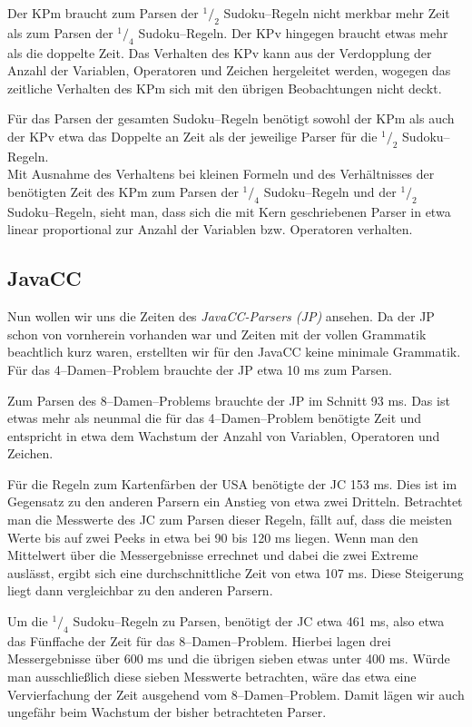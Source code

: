 \documentclass[ngerman,a4paper,abstracton,open=right,twoside=false,toc=listofnumbered,bibtotocnumbered]{scrreprt}
\begin{document}
Der KPm braucht zum Parsen der $^1/_2$ Sudoku--Regeln nicht merkbar mehr Zeit als zum Parsen der $^1/_4$ Sudoku--Regeln. Der KPv hingegen braucht etwas mehr als die doppelte Zeit. Das Verhalten des KPv kann aus der Verdopplung der Anzahl der Variablen, Operatoren und Zeichen hergeleitet werden, wogegen das zeitliche Verhalten des KPm sich mit den übrigen Beobachtungen nicht deckt.

Für das Parsen der gesamten Sudoku--Regeln benötigt sowohl der KPm als auch der KPv etwa das Doppelte an Zeit als der jeweilige Parser für die $^1/_2$ Sudoku--Regeln.\\

Mit Ausnahme des Verhaltens bei kleinen Formeln und des Verhältnisses der benötigten Zeit des KPm zum Parsen der $^1/_4$ Sudoku--Regeln und der $^1/_2$ Sudoku--Regeln, sieht man, dass sich die mit Kern geschriebenen Parser in etwa linear proportional zur Anzahl der Variablen bzw. Operatoren verhalten.

\subsection{JavaCC}

Nun wollen wir uns die Zeiten des \emph{JavaCC-Parsers (JP)} ansehen. Da der JP schon von vornherein vorhanden war und Zeiten mit der vollen Grammatik beachtlich kurz waren, erstellten wir für den JavaCC keine minimale Grammatik. Für das 4--Damen--Problem brauchte der JP etwa 10 ms zum Parsen.

Zum Parsen des 8--Damen--Problems brauchte der JP im Schnitt 93 ms. Das ist etwas mehr als neunmal die für das 4--Damen--Problem benötigte Zeit und entspricht in etwa dem Wachstum der Anzahl von Variablen, Operatoren und Zeichen.

Für die Regeln zum Kartenfärben der USA benötigte der JC 153 ms. Dies ist im Gegensatz zu den anderen Parsern ein Anstieg von etwa zwei Dritteln. Betrachtet man die Messwerte des JC zum Parsen dieser Regeln, fällt auf, dass die meisten Werte bis auf zwei Peeks in etwa bei 90 bis 120 ms liegen. Wenn man den Mittelwert über die Messergebnisse errechnet und dabei die zwei Extreme auslässt, ergibt sich eine durchschnittliche Zeit von etwa 107 ms. Diese Steigerung liegt dann vergleichbar zu den anderen Parsern.

Um die $^1/_4$ Sudoku--Regeln zu Parsen, benötigt der JC etwa 461 ms, also etwa das Fünffache der Zeit für das 8--Damen--Problem. Hierbei lagen drei Messergebnisse über 600 ms und die übrigen sieben etwas unter 400 ms. Würde man ausschließlich diese sieben Messwerte betrachten, wäre das etwa eine Vervierfachung der Zeit ausgehend vom 8--Damen--Problem. Damit lägen wir auch ungefähr beim Wachstum der bisher betrachteten Parser.
\end{document}
